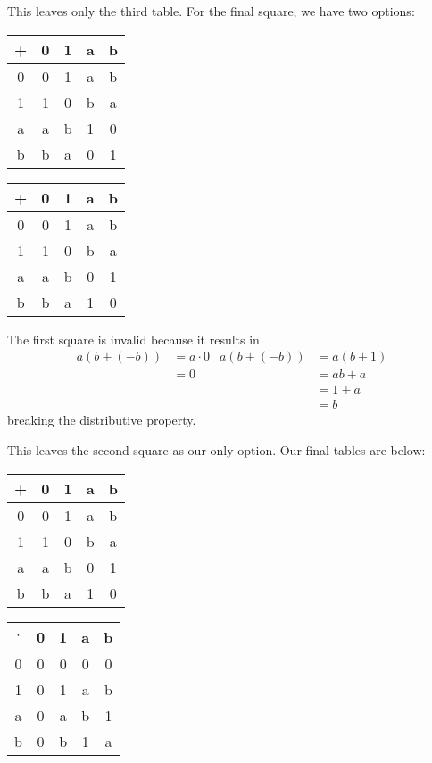 \documentclass[12pt]{article}
\begin{document}
This leaves only the third table.
For the final square, we have two options:
\begin{center}
      \hfill
      \begin{tabular}{ c|c|c|c|c }
            + & 0 & 1 & a & b \\ \hline
            0 & 0 & 1 & a & b \\ \hline
            1 & 1 & 0 & b & a \\ \hline
            a & a & b & 1 & 0 \\ \hline
            b & b & a & 0 & 1
      \end{tabular}
      \hfill
      \begin{tabular}{ c|c|c|c|c }
            + & 0 & 1 & a & b \\ \hline
            0 & 0 & 1 & a & b \\ \hline
            1 & 1 & 0 & b & a \\ \hline
            a & a & b & 0 & 1 \\ \hline
            b & b & a & 1 & 0
      \end{tabular}
      \hfill \mbox{}
\end{center}
The first square is invalid because it results in
\begin{align*}
      a(b+(-b)) & = a \cdot 0 & a(b+(-b)) & = a(b+1) \\
                & = 0         &           & = ab+a   \\
                &             &           & = 1+a    \\
                &             &           & = b
\end{align*}
breaking the distributive property.

This leaves the second square as our only option.
Our final tables are below:
\begin{center}
      \hfill
      \begin{tabular}{ c|c|c|c|c }
            + & 0 & 1 & a & b \\ \hline
            0 & 0 & 1 & a & b \\ \hline
            1 & 1 & 0 & b & a \\ \hline
            a & a & b & 0 & 1 \\ \hline
            b & b & a & 1 & 0
      \end{tabular}
      \hfill
      \begin{tabular}{ c|c|c|c|c }
            $\cdot$ & 0 & 1 & a & b \\ \hline
            0       & 0 & 0 & 0 & 0 \\ \hline
            1       & 0 & 1 & a & b \\ \hline
            a       & 0 & a & b & 1 \\ \hline
            b       & 0 & b & 1 & a
      \end{tabular}
      \hfill \mbox{}
\end{center}
\end{document}
